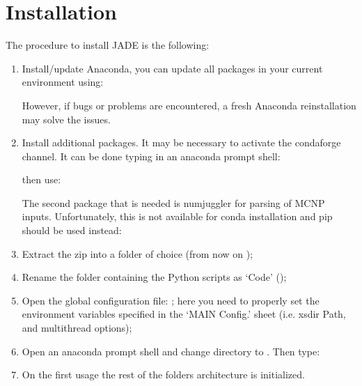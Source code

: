 \documentclass[letterpaper,10pt,english]{sphinxmanual}
\begin{document}
\chapter{Installation}
\label{\detokenize{usage/installation:installation}}\label{\detokenize{usage/installation:install}}\label{\detokenize{usage/installation::doc}}
The procedure to install JADE is the following:
\begin{enumerate}
%
\item {} 
Install/update Anaconda, you can update all packages in your current environment using:


However, if bugs or problems are encountered, a fresh Anaconda re\sphinxhyphen{}installation may solve the issues.

\item {} 
Install additional packages. It may be necessary to activate the conda\sphinxhyphen{}forge channel. It can be done typing in an anaconda prompt shell:


then use:


The second package that is needed is numjuggler for parsing of MCNP inputs.
Unfortunately, this is not available for conda installation and pip should be used instead:


\item {} 
Extract the zip into a folder of choice (from now on );

\item {} 
Rename the folder containing the Python scripts as ‘Code’ ();

\item {} 
Open the global configuration file: ;
here you need to properly set the environment variables specified in the ‘MAIN Config.’ sheet (i.e. xsdir Path, and multithread options);

\item {} 
Open an anaconda prompt shell and change directory to . Then type:


\item {} 
On the first usage the rest of the folders architecture is initialized.

\end{enumerate}
\end{document}
